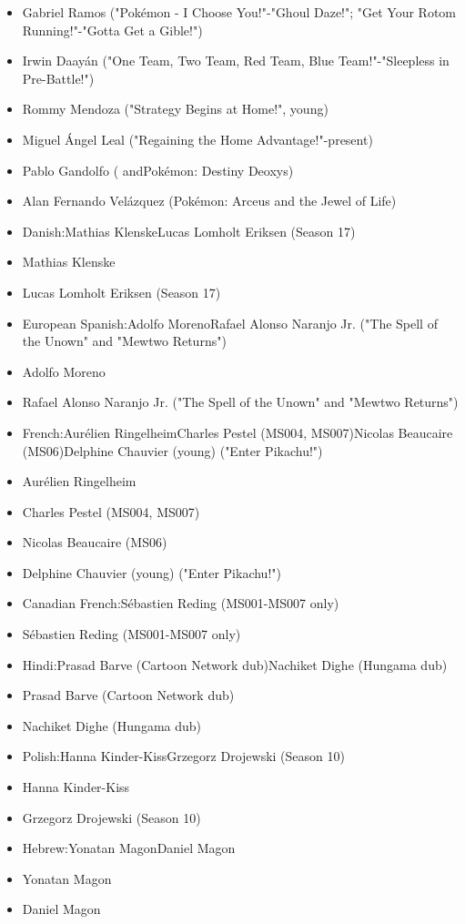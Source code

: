 \documentclass[a4paper,12pt]{article}
\begin{document}
\begin{itemize}
\item Gabriel Ramos ("Pokémon - I Choose You!"-"Ghoul Daze!"; "Get Your Rotom Running!"-"Gotta Get a Gible!")
\item Irwin Daayán ("One Team, Two Team, Red Team, Blue Team!"-"Sleepless in Pre-Battle!")
\item Rommy Mendoza ("Strategy Begins at Home!", young)
\item Miguel Ángel Leal ("Regaining the Home Advantage!"-present)
\item Pablo Gandolfo ( andPokémon: Destiny Deoxys)
\item Alan Fernando Velázquez (Pokémon: Arceus and the Jewel of Life)
\item Danish:Mathias KlenskeLucas Lomholt Eriksen (Season 17)
\item Mathias Klenske
\item Lucas Lomholt Eriksen (Season 17)
\item European Spanish:Adolfo MorenoRafael Alonso Naranjo Jr. ("The Spell of the Unown" and "Mewtwo Returns")
\item Adolfo Moreno
\item Rafael Alonso Naranjo Jr. ("The Spell of the Unown" and "Mewtwo Returns")
\item French:Aurélien RingelheimCharles Pestel (MS004, MS007)Nicolas Beaucaire (MS06)Delphine Chauvier (young) ("Enter Pikachu!")
\item Aurélien Ringelheim
\item Charles Pestel (MS004, MS007)
\item Nicolas Beaucaire (MS06)
\item Delphine Chauvier (young) ("Enter Pikachu!")
\item Canadian French:Sébastien Reding (MS001-MS007 only)
\item Sébastien Reding (MS001-MS007 only)
\item Hindi:Prasad Barve (Cartoon Network dub)Nachiket Dighe (Hungama dub)
\item Prasad Barve (Cartoon Network dub)
\item Nachiket Dighe (Hungama dub)
\item Polish:Hanna Kinder-KissGrzegorz Drojewski (Season 10)
\item Hanna Kinder-Kiss
\item Grzegorz Drojewski (Season 10)
\item Hebrew:Yonatan MagonDaniel Magon
\item Yonatan Magon
\item Daniel Magon

\end{itemize}
\end{document}
